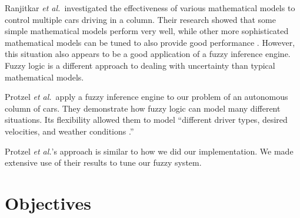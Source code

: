 \documentclass[12pt,letterpaper,oneside]{report}
\newcommand \qq[1]{``{#1}''}
\newcommand \etal{\textit{et al.}}
\begin{document}
Ranjitkar \etal~investigated the effectiveness of various mathematical models
to control multiple cars driving in a column. Their research showed that some
simple mathematical models perform very well, while other more sophisticated
mathematical models can be tuned to also provide good performance
\cite{Ranjitkar}. However, this situation also appears to be a good application
of a fuzzy inference engine. Fuzzy logic is a different approach to dealing
with uncertainty than typical mathematical models.  

Protzel \etal~apply a fuzzy inference engine to our problem of an autonomous
column of cars. They demonstrate how fuzzy logic can model many different
situations. Its flexibility allowed them to model \qq{different driver types,
desired velocities, and weather conditions \cite{protzel-fuzzy}.}

Protzel \etal's approach is similar to how we did our implementation. We made
extensive use of their results to tune our fuzzy system.

\clearpage
\section{Objectives}
\end{document}
